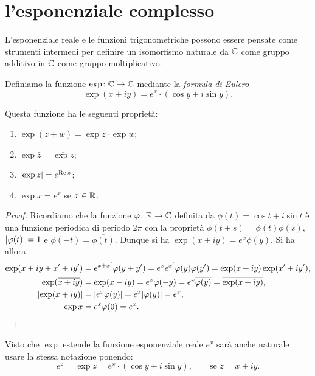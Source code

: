 \section{l'esponenziale complesso}
\label{sec:esponenziale_complesso}%

L'esponenziale reale e le funzioni trigonometriche possono essere pensate 
come strumenti intermedi per definire un isomorfismo naturale 
da ${\mathbb C}$ come gruppo additivo in ${\mathbb C}$ come gruppo moltiplicativo.

\begin{definition}
%
%
%
%
Definiamo la funzione $\exp \colon {\mathbb C} \to {\mathbb C}$ mediante 
la \emph{formula di Eulero}
  \[
    \exp(x+iy) = e^x \cdot (\cos y + i \sin y).
  \]
\end{definition}

\begin{theorem}
Questa funzione ha le seguenti proprietà:
\begin{enumerate}
  \item $\exp(z+w) = \exp z \cdot \exp w$;
  \item $\exp\bar z = \overline{\exp z}$;
  \item ${\left|\exp z\right|} = e^{\operatorname{Re} z}$;
  \item $\exp x = e^x$ se $x\in {\mathbb R}$.
\end{enumerate}
\end{theorem}
\begin{proof}
Ricordiamo che la funzione $\varphi\colon {\mathbb R}\to{\mathbb C}$ 
definita da $\phi(t) = \cos t + i \sin t$ è una funzione periodica di periodo $2\pi$
con la proprietà $\phi(t+s)=\phi(t)\phi(s)$, ${\left|\varphi(t)\right|}=1$ e $\phi(-t) = \overline{\phi(t)}$.
Dunque si ha $\exp(x+iy) = e^x \phi(y)$.
Si ha allora
\begin{align*}
 \exp(x+iy + x'+iy') 
 &= e^{x+x'} \varphi(y+y') = e^x e^{x'} \varphi(y) \varphi(y') = \exp(x+iy)\exp(x'+iy'),\\
 \exp(\overline{x+iy}) 
 &= \exp(x-iy) = e^x \varphi(-y) = e^x \overline{\varphi(y)} = \overline{\exp(x+iy)},\\
 {\left|\exp(x+iy)\right|} &= {\left|e^x \varphi(y)\right|} = e^x {\left|\varphi(y)\right|} = e^x,\\
  \exp x &= e^x \varphi(0) = e^x.
\end{align*}
\end{proof}

Visto che $\exp$ estende la funzione esponenziale reale $e^x$
sarà anche naturale usare la stessa notazione ponendo:
%
\[
  e^z = \exp z = e^x\cdot (\cos y + i\sin y), \qquad \text{se $z=x+iy$}.  
\]

